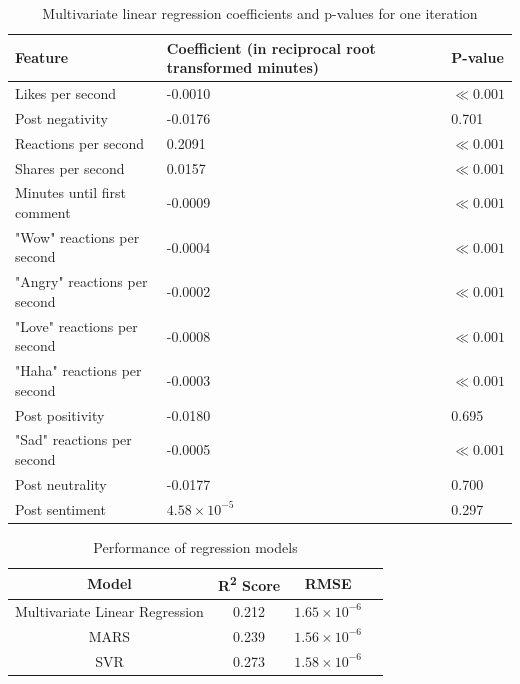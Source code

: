 \documentclass[twoside]{article}
\begin{document}
\begin{table}
\centering
   \caption{Multivariate linear regression coefficients and p-values for one iteration} \label{tab:coeffs}
   \begin{tabular}
      {lll} \hline \textbf{Feature} & \textbf{Coefficient (in reciprocal root transformed minutes)} & \textbf{P-value} \\
      \hline {Likes per second} & {-0.0010} & {$\ll 0.001$}\\
      \hline {Post negativity} & {-0.0176} & {0.701}\\
      \hline {Reactions per second} & {0.2091} & {$\ll 0.001$}\\
      \hline {Shares per second} & {0.0157} & {$\ll 0.001$}\\
      \hline {Minutes until first comment} & {-0.0009} & {$\ll 0.001$}\\
      \hline {"Wow" reactions per second} & {-0.0004} & {$\ll 0.001$}\\
      \hline {"Angry" reactions per second} & {-0.0002} & {$\ll 0.001$}\\
      \hline {"Love" reactions per second} & {-0.0008} & {$\ll 0.001$}\\
      \hline {"Haha" reactions per second} & {-0.0003} & {$\ll 0.001$}\\
      \hline {Post positivity} & {-0.0180} & {0.695}\\
      \hline {"Sad" reactions per second} & {-0.0005} & {$\ll 0.001$}\\
      \hline {Post neutrality} & {-0.0177} & {0.700}\\
      \hline {Post sentiment} & {$4.58 \times 10^{-5}$} & {0.297}\\
      \hline
   \end{tabular}
\end{table}
\begin{table}
   [ht] \caption{Performance of regression models} \label{tab:b}
   \begin{tabular*}{\textwidth}{c @{\extracolsep{\fill}} ccc}
      \hline \textbf{Model} & \textbf{R\textsuperscript{2} Score} & \textbf{RMSE} \\
      \hline Multivariate Linear Regression & 0.212 & $1.65 \times 10^{-6}$ \\
      \hline MARS & 0.239 & $1.56 \times 10^{-6}$  \\
      \hline SVR & 0.273 & $1.58 \times 10^{-6}$  \\
      \hline
   \end{tabular*}
\end{table}
\end{document}
